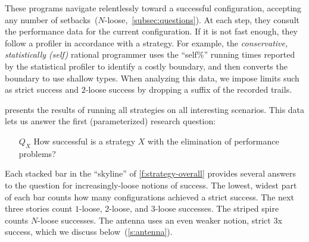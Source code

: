 These programs navigate relentlessly toward a successful configuration,
accepting any number of setbacks~($N$-loose,~\cref{subsec:questions}).
At each step, they consult the performance data for the current configuration.
If it is not fast enough, they follow a profiler in accordance with a strategy.
For example, the \emph{conservative, statistically (self)} rational programmer
uses the ``self\%'' running times reported by the statistical profiler to
identify a costly boundary, and then converts the boundary to use shallow types.
When analyzing this data, we impose limits such as strict success and
$2$-loose success by dropping a suffix of the recorded trails.

 presents the results of running all strategies on all
interesting scenarios.
This data lets us answer the first (parameterized) research question:

\begin{itemize}
  \item[$Q_X$] How successful is a strategy $X$ with the elimination of
    performance problems?
\end{itemize}

Each stacked bar in the ``skyline'' of \cref{f:strategy-overall} provides
several answers to the question for increasingly-loose notions of success.
The lowest, widest part of each bar counts how many configurations
achieved a strict success.
The next three stories count $1$-loose, $2$-loose, and $3$-loose successes.
The striped spire counts $N$-loose successes.
The antenna uses an even weaker notion, strict 3x success, which we discuss below~(\cref{s:antenna}).


